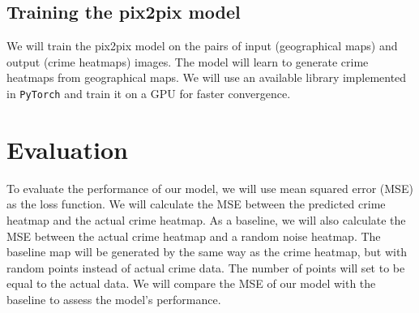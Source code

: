 \documentclass{article}
\begin{document}
\subsection{Training the pix2pix model}
We will train the pix2pix model on the pairs of input (geographical maps) and output (crime heatmaps) images. The model will learn to generate crime heatmaps from geographical maps. We will use an available library implemented in \verb|PyTorch| and train it on a GPU for faster convergence.

\section{Evaluation}
To evaluate the performance of our model, we will use mean squared error (MSE) as the loss function. We will calculate the MSE between the predicted crime heatmap and the actual crime heatmap. As a baseline, we will also calculate the MSE between the actual crime heatmap and a random noise heatmap. The baseline map will be generated by the same way as the crime heatmap, but with random points instead of actual crime data. The number of points will set to be equal to the actual data. We will compare the MSE of our model with the baseline to assess the model's performance.
\end{document}
